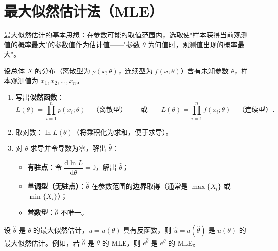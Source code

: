 \documentclass[lang=cn,11pt]{elegantbook}
\begin{document}
\section{最大似然估计法（MLE）} \label{subsec:mle}

最大似然估计的基本思想：在参数可能的取值范围内，选取使"样本获得当前观测值的概率最大"的参数值作为估计值——"参数 \(\theta\) 为何值时，观测值出现的概率最大"。

\begin{property}[最大似然估计的步骤] \label{prop:mle-steps}
设总体 \(X\) 的分布（离散型为 \(p(x;\theta)\)，连续型为 \(f(x;\theta)\)）含有未知参数 \(\theta\)，样本观测值为 \(x_1, x_2, \dots, x_n\)。
\begin{enumerate}
    \item 写出\textbf{似然函数}：
    \[
    L(\theta) = \prod_{i=1}^{n}p(x_i;\theta)\quad\text{（离散型）}\qquad\text{或}\qquad L(\theta) = \prod_{i=1}^{n}f(x_i;\theta)\quad\text{（连续型）}.
    \]
    \item 取对数：\(\ln L(\theta)\)（将乘积化为求和，便于求导）。
    \item 对 \(\theta\) 求导并令导数为零，解出 \(\hat{\theta}\)：
    \begin{itemize}
        \item \textbf{有驻点}：令 \(\dfrac{\mathrm{d}\ln L}{\mathrm{d}\theta} = 0\)，解出 \(\hat{\theta}\)；
        \item \textbf{单调型（无驻点）}：\(\hat{\theta}\) 在参数范围的\textbf{边界}取得（通常是 \(\max\{X_i\}\) 或 \(\min\{X_i\}\)）；
        \item \textbf{常数型}：\(\hat{\theta}\) 不唯一。
    \end{itemize}
\end{enumerate}
\end{property}



\begin{property}[最大似然估计的不变性] \label{prop:mle-inv}
设 \(\hat{\theta}\) 是 \(\theta\) 的最大似然估计，\(u = u(\theta)\) 具有反函数，则 \(\hat{u} = u(\hat{\theta})\) 是 \(u(\theta)\) 的最大似然估计。例如，若 \(\hat{\theta}\) 是 \(\theta\) 的 MLE，则 \(e^{\hat{\theta}}\) 是 \(e^\theta\) 的 MLE。
\end{property}
\end{document}
